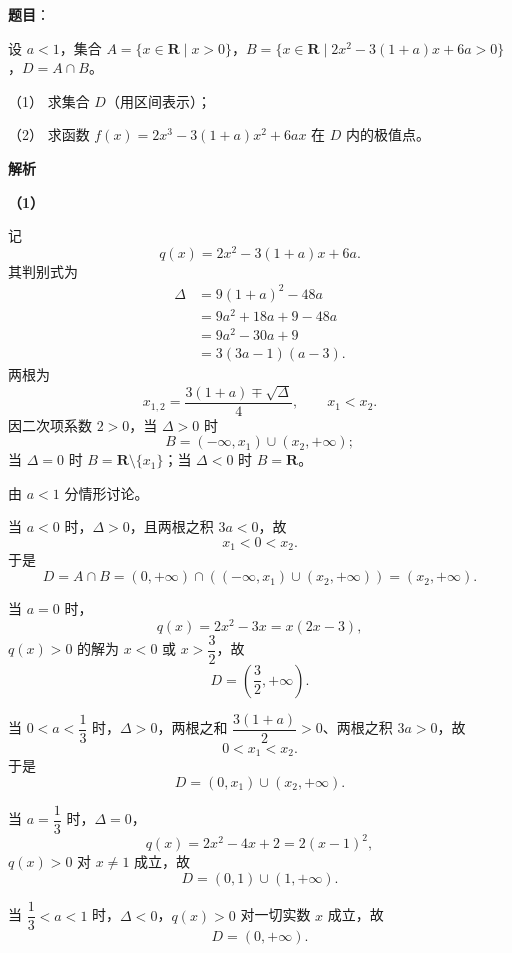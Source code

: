 \begin{answer}

\textbf{题目}：

设 $a<1$，集合 $A=\{x\in\mathbf R\mid x>0\}$，$B=\{x\in\mathbf R\mid 2x^2-3(1+a)x+6a>0\}$，$D=A\cap B$。

（1） 求集合 $D$（用区间表示）；

（2） 求函数 $f(x)=2x^3-3(1+a)x^2+6ax$ 在 $D$ 内的极值点。

\textbf{解析}

\textbf{（1）}

记
\nopagebreak[4]
\[q(x)=2x^2-3(1+a)x+6a.\]
其判别式为
\nopagebreak[4]
\[\begin{aligned}
\Delta&=9(1+a)^2-48a\\
&=9a^2+18a+9-48a\\
&=9a^2-30a+9\\
&=3(3a-1)(a-3).
\end{aligned}\]
两根为
\nopagebreak[4]
\[x_{1,2}=\frac{3(1+a)\mp\sqrt{\Delta}}4,\qquad x_1<x_2.\]
因二次项系数 $2>0$，当 $\Delta>0$ 时
\nopagebreak[4]
\[B=(-\infty,x_1)\cup(x_2,+\infty);\]
当 $\Delta=0$ 时 $B=\mathbf R\setminus\{x_1\}$；当 $\Delta<0$ 时 $B=\mathbf R$。

由 $a<1$ 分情形讨论。

当 $a<0$ 时，$\Delta>0$，且两根之积 $3a<0$，故
\nopagebreak[4]
\[x_1<0<x_2.\]
于是
\nopagebreak[4]
\[D=A\cap B=(0,+\infty)\cap\left((-\infty,x_1)\cup(x_2,+\infty)\right)=(x_2,+\infty).\]

当 $a=0$ 时，
\nopagebreak[4]
\[q(x)=2x^2-3x=x(2x-3),\]
$q(x)>0$ 的解为 $x<0$ 或 $x>\dfrac32$，故
\nopagebreak[4]
\[D=\left(\frac32,+\infty\right).\]

当 $0<a<\dfrac13$ 时，$\Delta>0$，两根之和 $\dfrac{3(1+a)}2>0$、两根之积 $3a>0$，故
\nopagebreak[4]
\[0<x_1<x_2.\]
于是
\nopagebreak[4]
\[D=(0,x_1)\cup(x_2,+\infty).\]

当 $a=\dfrac13$ 时，$\Delta=0$，
\nopagebreak[4]
\[q(x)=2x^2-4x+2=2(x-1)^2,\]
$q(x)>0$ 对 $x\neq1$ 成立，故
\nopagebreak[4]
\[D=(0,1)\cup(1,+\infty).\]

当 $\dfrac13<a<1$ 时，$\Delta<0$，$q(x)>0$ 对一切实数 $x$ 成立，故
\nopagebreak[4]
\[D=(0,+\infty).\]


\end{answer}
